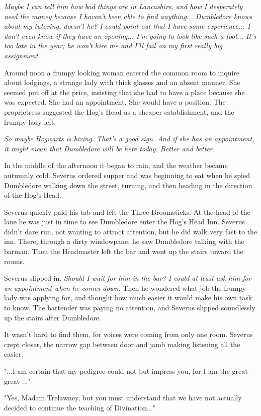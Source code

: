 \emph{Maybe I can tell him how bad things are in Lancashire, and how I desperately need the money because I haven't been able to find anything... Dumbledore knows about my tutoring, doesn't he? I could point out that I have some experience... I don't even know if they have an opening... I'm going to look like such a fool... It's too late in the year; he won't hire me and I'll fail on my first really big assignment.}

Around noon a frumpy looking woman entered the common room to inquire about lodgings, a strange lady with thick glasses and an absent manner. She seemed put off at the price, insisting that she had to have a place because she was expected. She had an appointment. She would have a position. The proprietress suggested the Hog's Head as a cheaper establishment, and the frumpy lady left.

\emph{So maybe Hogwarts is hiring. That's a good sign. And if she has an appointment, it might mean that Dumbledore will be here today. Better and better.}

In the middle of the afternoon it began to rain, and the weather became autumnly cold. Severus ordered supper and was beginning to eat when he spied Dumbledore walking down the street, turning, and then heading in the direction of the Hog's Head.

Severus quickly paid his tab and left the Three Broomsticks. At the head of the lane he was just in time to see Dumbledore enter the Hog's Head Inn. Severus didn't dare run, not wanting to attract attention, but he did walk very fast to the inn. There, through a dirty windowpane, he saw Dumbledore talking with the barman. Then the Headmaster left the bar and went up the stairs toward the rooms.

Severus slipped in. \emph{Should I wait for him in the bar? I could at least ask him for an appointment when he comes down.} Then he wondered what job the frumpy lady was applying for, and thought how much easier it would make his own task to know. The bartender was paying no attention, and Severus slipped soundlessly up the stairs after Dumbledore.

It wasn't hard to find them, for voices were coming from only one room. Severus crept closer, the narrow gap between door and jamb making listening all the easier.

"...I am certain that my pedigree could not but impress you, for I am the great-great-..."

"Yes, Madam Trelawney, but you must understand that we have not actually decided to continue the teaching of Divination..."

